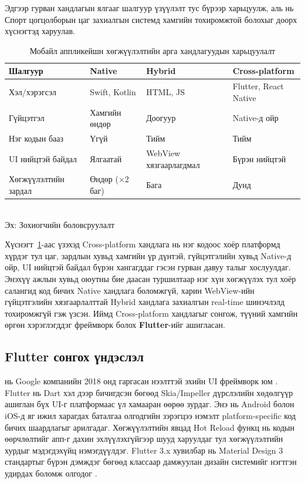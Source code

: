 Эдгээр гурван хандлагын ялгааг шалгуур үзүүлэлт тус бүрээр харьцуулж, аль нь Спорт цогцолборын цаг захиалгын системд хамгийн тохиромжтой болохыг доорх хүснэгтэд харуулав.

\begin{table}[h]
\centering
\caption{Мобайл аппликейшн хөгжүүлэлтийн арга хандлагуудын харьцуулалт}
\label{tab:mobile_approach}
\begin{tabularx}{\textwidth}{|p{2.5cm}|X|X|X|}
\hline
\textbf{Шалгуур} & \textbf{Native} & \textbf{Hybrid} & \textbf{Cross-platform} \\
\hline
Хэл/хэрэгсэл & Swift, Kotlin & HTML, JS & Flutter, React Native \\
\hline
Гүйцэтгэл & Хамгийн өндөр & Доогуур & Native-д ойр \\
\hline
Нэг кодын бааз & Үгүй & Тийм & Тийм \\
\hline
UI нийцтэй байдал & Ялгаатай & WebView хязгаарлагдмал & Бүрэн нийцтэй \\
\hline
Хөгжүүлэлтийн зардал & Өндөр (×2 баг) & Бага & Дунд \\
\hline
\end{tabularx}\\[4pt]
{\footnotesize Эх: Зохиогчийн боловсруулалт}
\end{table}

Хүснэгт~\ref{tab:mobile_approach}-аас үзэхэд Cross-platform хандлага нь нэг кодоос хоёр платформд хүрдэг тул цаг, зардлын хувьд хамгийн үр дүнтэй, гүйцэтгэлийн хувьд Native-д ойр, UI нийцтэй байдал бүрэн хангагддаг гэсэн гурван давуу талыг хослуулдаг. Энэхүү ажлын хувьд оюутны бие даасан туршилтаар нэг хүн хөгжүүлэх тул хоёр салангид код бичих Native хандлага боломжгүй, харин WebView-ийн гүйцэтгэлийн хязгаарлалттай Hybrid хандлага захиалгын real-time шинэчлэлд тохиромжгүй гэж үзсэн. Иймд Cross-platform хандлагыг сонгож, түүний хамгийн өргөн хэрэглэгддэг фреймворк болох \textbf{Flutter}-ийг ашигласан.

\subsection*{Flutter сонгох үндэслэл}

 нь Google компанийн 2018 онд гаргасан нээлттэй эхийн UI фреймворк юм \cite{flutter_doc}. Flutter нь Dart хэл дээр бичигдсэн бөгөөд Skia/Impeller дүрслэлийн хөдөлгүүр ашиглан бүх UI-г платформаас үл хамааран өөрөө зурдаг. Энэ нь Android болон iOS-д яг ижил харагдах баталгаа олгодгийн зэрэгцээ нэмэлт platform-specific код бичих шаардлагыг арилгадаг. Хөгжүүлэлтийн явцад Hot Reload функц нь кодын өөрчлөлтийг апп-г дахин эхлүүлэхгүйгээр шууд харуулдаг тул хөгжүүлэлтийн хурдыг мэдэгдэхүйц нэмэгдүүлдэг. Flutter 3.x хувилбар нь Material Design 3 стандартыг бүрэн дэмждэг бөгөөд  классаар дамжуулан дизайн системийг нэгтгэн удирдах боломж олгодог \cite{material3}.

